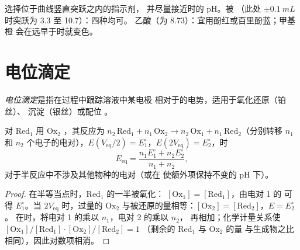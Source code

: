 \begin{method}[选择指示剂]\label{met:b1:titration-methods:choose-indicator}
选择位于曲线竖直突跃之内的指示剂，
并尽量接近时的 pH。被
（此处 $\pm\qty{0.1}{mL}$ 时突跃为 3.3 至 10.7）：四种均可。
乙酸（为 8.73）：宜用酚红或百里酚蓝；甲基橙
会在远早于时就变色。
\end{method}

\section{电位滴定}

\begin{definition}[电位滴定]\label{def:b1:titration-methods:potentiometric}
\emph{电位滴定}是指在过程中跟踪溶液中某电极
相对于的电势，适用于氧化还原（铂丝）、
沉淀（银丝）或配位
。
\end{definition}

\begin{proposition}[氧化还原滴定的特征点]\label{prop:b1:titration-methods:potentiometric-points}
对 $\mathrm{Red_1}$ 用 $\mathrm{Ox_2}$ ，其反应为
$n_2\,\mathrm{Red_1} + n_1\,\mathrm{Ox_2} \to n_2\,\mathrm{Ox_1} +
n_1\,\mathrm{Red_2}$（分别转移 $n_1$ 和 $n_2$ 个电子的电对），$E(V_{\mathrm{eq}}/2) = E^\circ_1$，$E(2V_{\mathrm{eq}}) =
E^\circ_2$，时
\[
  E_{\mathrm{eq}} = \frac{n_1E^\circ_1 + n_2E^\circ_2}{n_1 + n_2},
\]
对于半反应中不涉及其他物种的电对（或在
使额外项保持不变的 pH 下）。
\end{proposition}

\begin{proof}
在半等当点时，$\mathrm{Red_1}$ 的一半被氧化：
$[\mathrm{Ox_1}] = [\mathrm{Red_1}]$，由电对 1 的
可得 $E^\circ_1$。当 $2V_{\mathrm{eq}}$ 时，过量的 $\mathrm{Ox_2}$
与被还原的量相等：$[\mathrm{Ox_2}] = [\mathrm{Red_2}]$，$E = E^\circ_2$。
在时，将电对 1 的乘以 $n_1$，电对 2 的乘以 $n_2$，
再相加；化学计量关系使
$[\mathrm{Ox_1}]/[\mathrm{Red_1}] \cdot [\mathrm{Ox_2}]/[\mathrm{Red_2}] = 1$
（剩余的 $\mathrm{Red_1}$ 与 $\mathrm{Ox_2}$ 的量
与生成物之比相同），因此对数项相消。
\end{proof}

